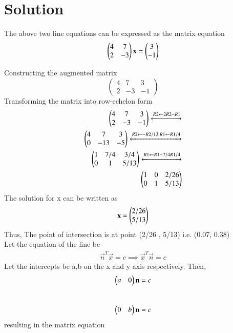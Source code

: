 \documentclass[journal,12pt,twocolumn]{IEEEtran}
\begin{document}
\section{Solution}
The above two line equations can be expressed as the matrix equation
\begin{align}
\begin{pmatrix}4 & 7\\2 & -3 \end{pmatrix}\textbf{x} = \begin{pmatrix}3\\-1 \end{pmatrix}
\end{align}
\begin{flushleft}
Constructing the augmented matrix \\
$$
\begin{pmatrix}
    4 & 7 & 3 \\ 
    2 & -3 & -1
\end{pmatrix}
$$
Transforming the matrix into row-echelon form \\
\begin{align}
\begin{pmatrix}
4 & 7 & 3 \\
2 & -3 & -1
\end{pmatrix}
  \xleftrightarrow[]{R2 \leftarrow 2R2 - R1 } \nonumber \\
\begin{pmatrix}
4 & 7 & 3 \\
0 & -13 & -5
\end{pmatrix}
\xleftrightarrow[]{R2 \leftarrow -R2/13,R1 \leftarrow R1/4} \nonumber \\
\begin{pmatrix}
1 & 7/4 & 3/4 \\
0 & 1 & 5/13
\end{pmatrix}
\xleftrightarrow[]{R1 \leftarrow R1-7/4R1/4} \nonumber \\
\begin{pmatrix}
1 & 0 & 2/26 \\
0 & 1 & 5/13
\end{pmatrix}
\end{align}
The solution for x can be written as 
\begin{equation}
\label{expk}
\mathbf{x} = \begin{pmatrix}2/26 \\ 5/13\end{pmatrix}
\end{equation}
Thus, The point of intersection is at point (2/26 , 5/13) i.e. (0.07, 0.38)\\
Let the equation of the line be
\begin{align}
\label{equ}
\vec{n}^T\vec{x} = c \implies \vec{x}^T\vec{n} = c
\end{align}
Let the intercepts be a,b on the x and y axis respectively. Then,
\begin{align} 
\begin{pmatrix}a & 0\end{pmatrix}\mathbf{n} = c
\end{align}
\\
\begin{align} 
\begin{pmatrix}0 & b\end{pmatrix}\mathbf{n} = c
\end{align}
resulting in the matrix equation
\begin{equation}

\end{equation}
\end{flushleft}
\end{document}
